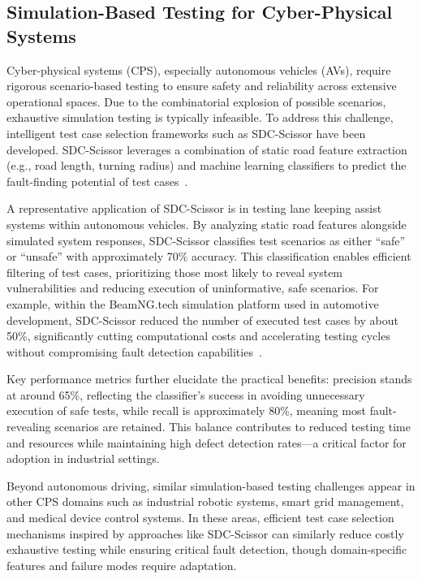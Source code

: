 \documentclass[sigconf]{acmart}
\begin{document}
\subsection{Simulation-Based Testing for Cyber-Physical Systems}

Cyber-physical systems (CPS), especially autonomous vehicles (AVs), require rigorous scenario-based testing to ensure safety and reliability across extensive operational spaces. Due to the combinatorial explosion of possible scenarios, exhaustive simulation testing is typically infeasible. To address this challenge, intelligent test case selection frameworks such as SDC-Scissor have been developed. SDC-Scissor leverages a combination of static road feature extraction (e.g., road length, turning radius) and machine learning classifiers to predict the fault-finding potential of test cases~\cite{ref29}.

A representative application of SDC-Scissor is in testing lane keeping assist systems within autonomous vehicles. By analyzing static road features alongside simulated system responses, SDC-Scissor classifies test scenarios as either ``safe'' or ``unsafe'' with approximately 70\% accuracy. This classification enables efficient filtering of test cases, prioritizing those most likely to reveal system vulnerabilities and reducing execution of uninformative, safe scenarios. For example, within the BeamNG.tech simulation platform used in automotive development, SDC-Scissor reduced the number of executed test cases by about 50\%, significantly cutting computational costs and accelerating testing cycles without compromising fault detection capabilities~\cite{ref29}.

Key performance metrics further elucidate the practical benefits: precision stands at around 65\%, reflecting the classifier's success in avoiding unnecessary execution of safe tests, while recall is approximately 80\%, meaning most fault-revealing scenarios are retained. This balance contributes to reduced testing time and resources while maintaining high defect detection rates—a critical factor for adoption in industrial settings.

Beyond autonomous driving, similar simulation-based testing challenges appear in other CPS domains such as industrial robotic systems, smart grid management, and medical device control systems. In these areas, efficient test case selection mechanisms inspired by approaches like SDC-Scissor can similarly reduce costly exhaustive testing while ensuring critical fault detection, though domain-specific features and failure modes require adaptation.
\end{document}
